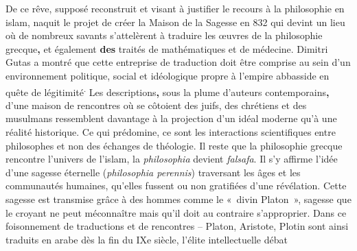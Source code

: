 De ce rêve, supposé reconstruit et visant à justifier le recours à la
philosophie en islam, naquit le projet de créer la Maison de la Sagesse
en 832 qui devint un lieu où de nombreux savants s'attelèrent à traduire
les œuvres de la philosophie grecque\textbf{,} et également \textbf{des}
traités de mathématiques et de médecine. Dimitri Gutas a montré que
cette entreprise de traduction doit être comprise au sein d'un
environnement politique, social et idéologique propre à l'empire
abbasside en quête de légitimité\textsuperscript{.} Les
descriptions\textbf{,} sous la plume d'auteurs contemporains\textbf{,}
d'une maison de rencontres où se côtoient des juifs, des chrétiens et
des musulmans ressemblent davantage à la projection d'un idéal moderne
qu'à une réalité historique. Ce qui prédomine,
ce sont les interactions scientifiques entre philosophes et non des
échanges de théologie. Il reste que la philosophie grecque rencontre
l'univers de l'islam, la \emph{philosophia} devient \emph{falsafa}. Il
s'y affirme l'idée d'une sagesse éternelle (\emph{philosophia perennis})
traversant les âges et les communautés humaines, qu'elles fussent ou non
gratifiées d'une révélation. Cette sagesse {est} transmise grâce
à des hommes comme le «~divin Platon~», sagesse que le croyant ne peut méconnaître
mais qu'il doit au contraire s'approprier. Dans ce foisonnement de
traductions et de rencontres -- Platon, Aristote, Plotin sont ainsi
traduits en arabe dès la fin du IXe siècle, l'élite intellectuelle débat
